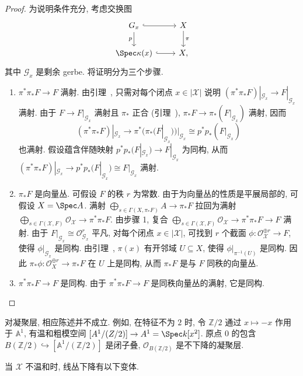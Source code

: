 \begin{proof}
为说明条件充分, 考虑交换图
\[
\begin{tikzcd}
\mathcal G_x\arrow[r,hook]\arrow[d,"p"']&\mathcal X\arrow[d,"\pi"]\\
\Spec\kappa(x)\arrow[r,hook]&X,
\end{tikzcd}
\]
其中 $\mathcal G_x$ 是剩余 gerbe. 将证明分为三个步骤.
\begin{enumerate}[{步骤} 1:]
\item $\pi^*\pi_*F\to F$ 满射. 由引理~, 只需对每个闭点 $x\in|\mathcal X|$ 说明 $(\pi^*\pi_*F)|_{\mathcal G_x}\to F|_{\mathcal G_x}$ 满射. 由于 $F\to F|_{\mathcal G_x}$ 满射且 $\pi_*$ 正合 (引理~), $\pi_*F\to\pi_*(F|_{\mathcal G_x})$ 满射, 因而
\[
(\pi^*\pi_*F)|_{\mathcal G_x}\longrightarrow\pi^*\bigl(\pi_*(F|_{\mathcal G_x})\bigr)|_{\mathcal G_x}\cong p^*p_*(F|_{\mathcal G_x})
\]
也满射. 假设蕴含伴随映射 $p^*p_*(F|_{\mathcal G_x})\to F|_{\mathcal G_x}$ 为同构, 从而 $(\pi^*\pi_*F)|_{\mathcal G_x}\to p^*p_*(F|_{\mathcal G_x})\cong F|_{\mathcal G_x}$ 满射.
\item $\pi_*F$ 是向量丛. 可假设 $F$ 的秩 $r$ 为常数. 由于为向量丛的性质是平展局部的, 可假设 $X=\Spec A$. 满射 $\bigoplus_{s\in\Gamma(X,\pi_*F)}A\to\pi_*F$ 拉回为满射 $\bigoplus_{s\in\Gamma(\mathcal X,F)}\mathcal O_{\mathcal X}\to\pi^*\pi_*F$. 由步骤 1, 复合 $\bigoplus_{s\in\Gamma(\mathcal X,F)}\mathcal O_{\mathcal X}\to\pi^*\pi_*F\to F$ 满射. 由于 $F|_{\mathcal G_x}\cong\mathcal O_{\mathcal G_x}^r$ 平凡, 对每个闭点 $x\in|\mathcal X|$, 可找到 $r$ 个截面 $\phi:\mathcal O_{\mathcal X}^{\oplus r}\to F$, 使得 $\phi|_{\mathcal G_x}$ 是同构. 由引理~, $\pi(x)$ 有开邻域 $U\subseteq X$, 使得 $\phi|_{\pi^{-1}(U)}$ 是同构. 因此 $\pi_*\phi:\mathcal O_X^{\oplus r}\to\pi_*F$ 在 $U$ 上是同构, 从而 $\pi_*F$ 是与 $F$ 同秩的向量丛.
\item $\pi^*\pi_*F\to F$ 是同构. 由于 $\pi^*\pi_*F\to F$ 是同秩向量丛的满射, 它是同构.
\end{enumerate}
\end{proof}
\begin{remark}\label{src:5.4.28}
对凝聚层, 相应陈述并不成立. 例如, 在特征不为 $2$ 时, 令 $\mathbb Z/2$ 通过 $x\mapsto-x$ 作用于 $\mathbb A^1$, 有温和粗模空间 $[\mathbb A^1/(\mathbb Z/2)]\to\mathbb A^1=\Spec k[x^2]$. 原点 $0$ 的包含 $B(\mathbb Z/2)\hookrightarrow[\mathbb A^1/(\mathbb Z/2)]$ 是闭子叠, $\mathcal O_{B(\mathbb Z/2)}$ 是不下降的凝聚层.
\end{remark}
当 $\mathcal X$ 不温和时, 线丛下降有以下变体.

